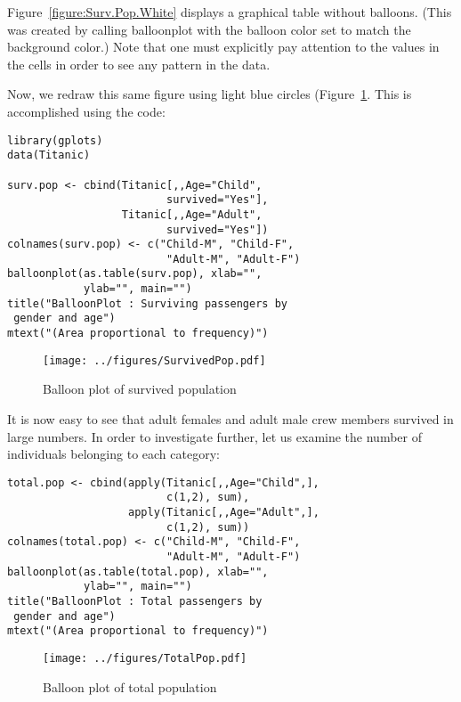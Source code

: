 \documentclass[a4paper]{report}
\begin{document}
\begin{article}
Figure~\ref{figure:Surv.Pop.White} displays a graphical table
without balloons.  (This was created by calling balloonplot with
the balloon color set to match the background color.)  Note
that one must explicitly pay attention to the values in the cells in
order to see any pattern in the data.

Now, we redraw this same figure using light blue circles
(Figure~\ref{figure:Surv.Pop}.  This is accomplished using the code:

{\small
\begin{verbatim}
library(gplots)
data(Titanic)

surv.pop <- cbind(Titanic[,,Age="Child", 
                         survived="Yes"],
                  Titanic[,,Age="Adult", 
                         survived="Yes"])
colnames(surv.pop) <- c("Child-M", "Child-F",
                         "Adult-M", "Adult-F")
balloonplot(as.table(surv.pop), xlab="", 
            ylab="", main="")
title("BalloonPlot : Surviving passengers by
 gender and age")
mtext("(Area proportional to frequency)")
\end{verbatim}
 }

\begin{figure}
\texttt{[image: ../figures/SurvivedPop.pdf]}
\caption{\label{figure:Surv.Pop}
Balloon plot of survived population}
\end{figure}

It is now easy to see that adult females and adult male crew
members survived in large numbers. In order to investigate further,
let us examine the number of individuals belonging to each
category:

\vspace{-0.25in}

{\small
\begin{verbatim}
total.pop <- cbind(apply(Titanic[,,Age="Child",],
                         c(1,2), sum), 
                   apply(Titanic[,,Age="Adult",], 
                         c(1,2), sum))
colnames(total.pop) <- c("Child-M", "Child-F", 
                         "Adult-M", "Adult-F")
balloonplot(as.table(total.pop), xlab="",
            ylab="", main="")
title("BalloonPlot : Total passengers by
 gender and age")
mtext("(Area proportional to frequency)")
\end{verbatim}
 }


\begin{figure}
\texttt{[image: ../figures/TotalPop.pdf]}
\caption{\label{figure:Total.Pop}
Balloon plot of total population}
\end{figure}


\end{article}
\end{document}
